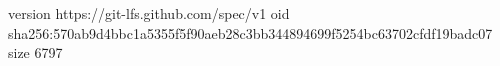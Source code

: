 version https://git-lfs.github.com/spec/v1
oid sha256:570ab9d4bbc1a5355f5f90aeb28c3bb344894699f5254bc63702cfdf19badc07
size 6797
